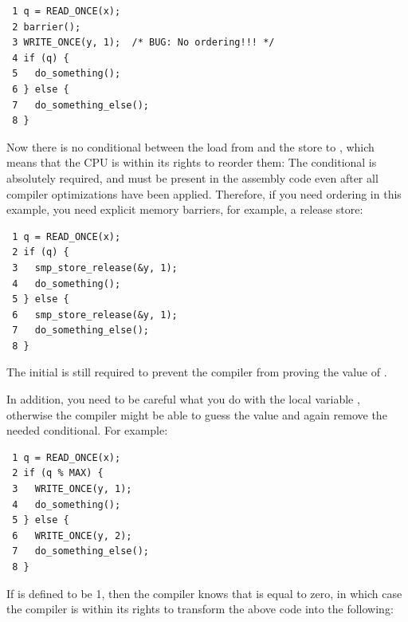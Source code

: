 \begin{enumerate}
\vspace{5pt}
\begin{minipage}[t]{\columnwidth}
\scriptsize
\begin{verbatim}
 1 q = READ_ONCE(x);
 2 barrier();
 3 WRITE_ONCE(y, 1);  /* BUG: No ordering!!! */
 4 if (q) {
 5   do_something();
 6 } else {
 7   do_something_else();
 8 }
\end{verbatim}
\end{minipage}
\vspace{5pt}

Now there is no conditional between the load from  and the store to
, which means that the CPU is within its rights to reorder them:
The conditional is absolutely required, and must be present in the
assembly code even after all compiler optimizations have been applied.
Therefore, if you need ordering in this example, you need explicit
memory barriers, for example, a release store:

\vspace{5pt}
\begin{minipage}[t]{\columnwidth}
\scriptsize
\begin{verbatim}
 1 q = READ_ONCE(x);
 2 if (q) {
 3   smp_store_release(&y, 1);
 4   do_something();
 5 } else {
 6   smp_store_release(&y, 1);
 7   do_something_else();
 8 }
\end{verbatim}
\end{minipage}
\vspace{5pt}

The initial  is still required to prevent the compiler from
proving the value of .

In addition, you need to be careful what you do with the local variable
,
otherwise the compiler might be able to guess the value and again remove
the needed conditional.
For example:

\vspace{5pt}
\begin{minipage}[t]{\columnwidth}
\scriptsize
\begin{verbatim}
 1 q = READ_ONCE(x);
 2 if (q % MAX) {
 3   WRITE_ONCE(y, 1);
 4   do_something();
 5 } else {
 6   WRITE_ONCE(y, 2);
 7   do_something_else();
 8 }
\end{verbatim}
\end{minipage}
\vspace{5pt}

If  is defined to be 1, then the compiler knows that  is
equal to zero, in which case the compiler is within its rights to
transform the above code into the following:


\end{enumerate}
